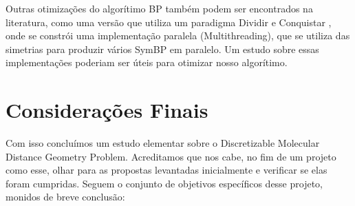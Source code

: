 \documentclass[a4paper,12pt]{article}
\begin{document}
	Outras otimizações do algorítimo BP também podem ser encontrados na literatura, como uma versão que utiliza um paradigma Dividir e Conquistar \cite{fidalgotese}, onde se constrói uma implementação paralela (Multithreading), que se utiliza das simetrias para produzir vários SymBP em paralelo. Um estudo sobre essas implementações poderiam ser úteis para otimizar nosso algorítimo.
	
	\newpage
	\section{Considerações Finais}
	Com isso concluímos um estudo elementar sobre o Discretizable Molecular Distance Geometry Problem. Acreditamos que nos cabe, no fim de um projeto como esse, olhar para as propostas levantadas inicialmente e verificar se elas foram cumpridas. Seguem o conjunto de objetivos específicos desse projeto, monidos de breve conclusão:
	
\end{document}
